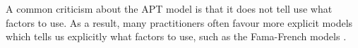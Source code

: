\documentclass[12pt]{article}
\makeatletter
\renewcommand\paragraph{%
	\@startsection{paragraph}
	{4}
	{\z@}
	{3.25ex \@plus1ex \@minus.2ex}
	{-1em}
	{\normalfont\normalsize\bfseries\maybe@addperiod}%
}
\newcommand{\maybe@addperiod}[1]{%
	#1\@addpunct{.}%
}
\DeclareMathOperator*{\argmin}{arg\,min}
\makeatother
\begin{document}
A common criticism about the APT model is that it does not tell use what factors to use. As a result, many practitioners often favour more explicit models which tells us explicitly what factors to use, such as the Fama-French models \citep{fama1993jofe,fama2015jofe}.
%
%
\newpage


\end{document}
